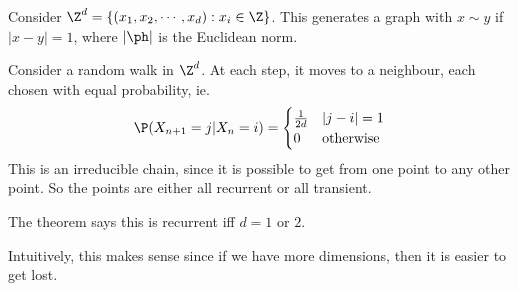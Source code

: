 \documentclass[a4paper]{article}
\begin{document}
\begin{thm}
  Consider $\Z^d = \{(x_1, x_2, \cdots, x_d): x_i \in \Z\}$. This generates a graph with $x\sim y$ if $|x - y| = 1$, where $|\ph |$ is the Euclidean norm.
  \begin{center}
  \end{center}
  Consider a random walk in $\Z^d$. At each step, it moves to a neighbour, each chosen with equal probability, ie.
   \[
    \P(X_{n + 1} = j| X_n = i) =
    \begin{cases}
      \frac{1}{2d} & |j - i| = 1\\
      0 & \text{otherwise}
    \end{cases}
  \]
  This is an irreducible chain, since it is possible to get from one point to any other point. So the points are either all recurrent or all transient.

  The theorem says this is recurrent iff $d = 1$ or $2$.
\end{thm}
Intuitively, this makes sense since if we have more dimensions, then it is easier to get lost.
\end{document}
